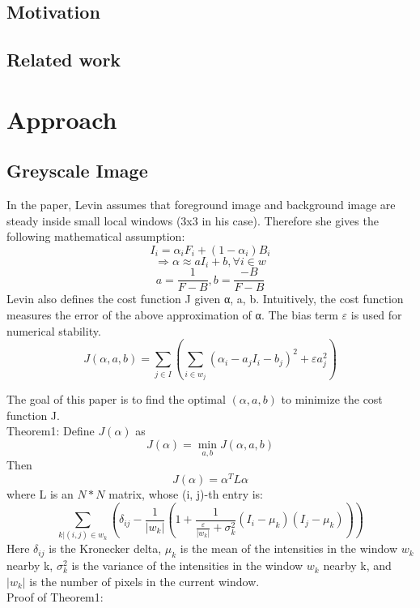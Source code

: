 \documentclass[11pt,letterpaper]{article}
\begin{document}
\subsection{Motivation}

\subsection{Related work}

\section{Approach}
\subsection{Greyscale Image}
In the paper, Levin assumes that foreground image and background image are steady inside small local windows (3x3 in his case). Therefore she gives the following mathematical assumption:
$$I_i = \alpha_i F_i + (1 - \alpha_i)B_i$$
$$\Rightarrow \alpha \approx aI_{i} + b, \forall i \in w $$
$$a = \frac{1}{F-B}, b = \frac{-B}{F-B} $$
Levin also defines the cost function J given α, a, b. Intuitively, the cost function measures the error of the above approximation of α. The bias term $\varepsilon$ is used for numerical stability.
$$J(\alpha, a, b) = \sum_{j \in I}(\sum_{i \in w_j}(\alpha_i - a_jI_i-b_j)^2+\varepsilon a_j^2)$$

The goal of this paper is to find the optimal $(\alpha, a, b)$ to minimize the cost function J.\\

Theorem1: Define $J(\alpha)$ as 
$$J(\alpha) = \min_{a,b} J(\alpha, a, b)$$
Then
$$J(\alpha) = \alpha^T L \alpha$$
where L is an $N * N$ matrix, whose (i, j)-th entry is:
$$\sum_{k|(i, j) \in w_k}(\delta_{ij} - \frac{1}{|w_k|}(1+\frac{1}{\frac{\varepsilon}{|w_k|} + \sigma_k^2}(I_i - \mu_k)(I_j - \mu_k)))$$
Here $\delta_{ij}$ is the Kronecker delta, $\mu_k$ is the mean of the intensities in the window $w_k$  nearby k, $\sigma_k^2$ is the variance of the intensities in the window $w_k$  nearby k, and $|w_k|$ is the number of pixels in the current window. \\

Proof of Theorem1:\\
\end{document}
